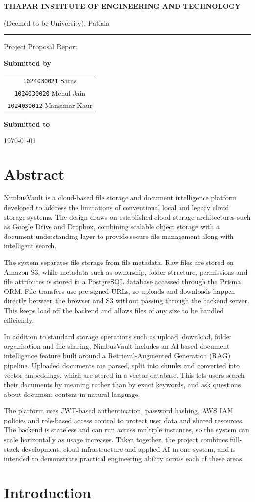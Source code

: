 \documentclass[11pt,a4paper,oneside]{report}
\author{%
  \texttt{1024030021} Saras \\
  \texttt{1024030020} Mehul Jain \\
  \texttt{1024030012} Mansimar Kaur%
}
\newcommand{\TIETHeader}{}
\newcommand{\TIETProjectTitle}{}
\newcommand{\TIETProjectSubTitle}{}
\newcommand{\TIETSubText}{}
\newcommand{\TIETAdvisor}{}
\newcommand{\TIETFooterText}{}
\renewcommand{\maketitle}{%
  \begin{titlepage}
    \thispagestyle{empty}
    \centering
    \vspace*{0.8cm}
    {\large\bfseries THAPAR INSTITUTE OF ENGINEERING AND TECHNOLOGY\par}
    \vspace{0.15cm}
    {\normalsize (Deemed to be University), Patiala\par}
    \vspace{0.35cm}
    \rule{\linewidth}{0.8pt}\par
    \vspace{0.8cm}
    {\large\bfseries \TIETHeader\par}
    \vspace{1.8cm}
    {\Large\bfseries \TIETProjectTitle\par}
    \vspace{0.4cm}
    {\large \TIETProjectSubTitle\par}
    \vspace{1.2cm}
    {\large Project Proposal Report\par}
    \vspace{0.8cm}
    \begin{minipage}{0.85\textwidth}
      \centering
      \TIETSubText
    \end{minipage}\par
    \vspace{1cm}
    {\bfseries Submitted by\par}
    \vspace{0.2cm}
    \begin{tabular}{c}
      \texttt{1024030021} Saras\\
      \texttt{1024030020} Mehul Jain\\
      \texttt{1024030012} Mansimar Kaur
    \end{tabular}\par
    \vspace{0.8cm}
    {\bfseries Submitted to\par}
    \vspace{0.2cm}
    {\TIETAdvisor\par}
    \vfill
    \begin{minipage}{0.9\textwidth}
      \centering
      \TIETFooterText
    \end{minipage}\par
    \vspace{0.4cm}
    {\today\par}
  \end{titlepage}
}
\begin{document}
\maketitle
\tableofcontents

\chapter*{Abstract}

NimbusVault is a cloud-based file storage and document intelligence platform developed to address the limitations of conventional local and legacy cloud storage systems. The design draws on established cloud storage architectures such as Google Drive and Dropbox, combining scalable object storage with a document understanding layer to provide secure file management along with intelligent search.

The system separates file storage from file metadata. Raw files are stored on Amazon S3, while metadata such as ownership, folder structure, permissions and file attributes is stored in a PostgreSQL database accessed through the Prisma ORM. File transfers use pre-signed URLs, so uploads and downloads happen directly between the browser and S3 without passing through the backend server. This keeps load off the backend and allows files of any size to be handled efficiently.

In addition to standard storage operations such as upload, download, folder organisation and file sharing, NimbusVault includes an AI-based document intelligence feature built around a Retrieval-Augmented Generation (RAG) pipeline. Uploaded documents are parsed, split into chunks and converted into vector embeddings, which are stored in a vector database. This lets users search their documents by meaning rather than by exact keywords, and ask questions about document content in natural language.

The platform uses JWT-based authentication, password hashing, AWS IAM policies and role-based access control to protect user data and shared resources. The backend is stateless and can run across multiple instances, so the system can scale horizontally as usage increases. Taken together, the project combines full-stack development, cloud infrastructure and applied AI in one system, and is intended to demonstrate practical engineering ability across each of these areas.



\chapter{Introduction}
\end{document}
